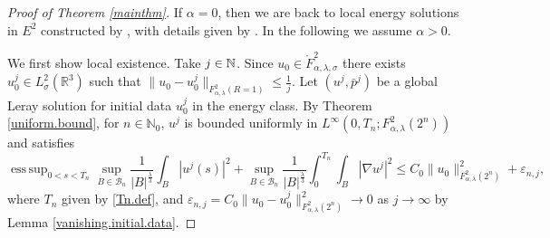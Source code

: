 \documentclass[11pt]{article}
\numberwithin{equation}{section}
\theoremstyle{remark}
\theoremstyle{definition}
\newcommand{\cB}{\mathcal{B}}
\newcommand{\R}{\mathbb{R}}
\newcommand{\si}{\sigma}
\newcommand\al{\alpha}
\newcommand\e {\varepsilon}  %
\newcommand\la{\lambda}
\newcommand{\NN}{\mathbb{N}}
\newcommand{\esssup} {\mathop{\mathrm{ess\,sup}}}
\newcommand{\EQ}[1]{\begin{equation} #1 \end{equation}}
\begin{document}
\begin{proof}[Proof of Theorem \ref{mainthm}]
If $\al  =0$, then we are back to local energy solutions in $E^2$ constructed by \cite{LR}, with details given by \cite{KiSe}.
%
%
%
%
In the following we assume $\al  >0$.

We first show local existence. Take $j\in \Bbb N$. Since $u_0\in \mathring F^2_{\al,\la,\si}$ there exists $u_0^j\in L^2_\si(\R^3)$ such that $\|u_0-u_0^j\|_{F^{2}_{\al,\la}(R=1)}\le\frac{1}{j}$. Let $(u^j,\bar{p}^j)$ be a global Leray solution for initial data $u_0^j$ in the energy class. By Theorem \ref{uniform.bound}, for $n \in \NN_0$, $u^j$ is bounded uniformly in $L^{\infty}(0,T_n;F^2_{\al,\la}(2^{n}))$ and satisfies
\EQ{\label{sequence.bound-loc}
\esssup_{0<s<T_n}\sup_{B\in \cB_n} \frac 1 {|B|^{\frac\la3}}\int_B |u^j(s)|^2 +\sup_{B\in \mathcal{B}_n}\frac{1}{|B|^{\frac\la3}}\int_0^{T_n}\!\!\!\int_{B}|\nabla u^j|^2\le C_0\|u_0\|_{F^2_{\al,\la}(2^{n})}^2
+ \e_{n,j},
  }
where $T_n$ given by \eqref{Tn.def}, and $\e_{n,j}=C_0\|u_0-u_0^j\|_{F^2_{\al,\la}(2^{n})}^2 \to0$ as $j\to\infty$ by Lemma \ref{vanishing.initial.data}.


%


\end{proof}
\end{document}
